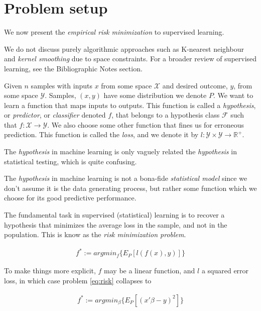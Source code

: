 \documentclass[]{book}
\theoremstyle{definition}
\theoremstyle{definition}
\theoremstyle{remark}
\let\BeginKnitrBlock\begin \let\EndKnitrBlock\end
\begin{document}
\section{Problem setup}\label{problem-setup-3}

We now present the \emph{empirical risk minimization} to supervised
learning.

\BeginKnitrBlock{remark}
We do not discuss purely algorithmic approaches
such as K-nearest neighbour and \emph{kernel smoothing} due to space
constraints. For a broader review of supervised learning, see the
Bibliographic Notes section.
\EndKnitrBlock{remark}

Given \(n\) samples with inputs \(x\) from some space \(\mathcal{X}\)
and desired outcome, \(y\), from some space \(\mathcal{Y}\). Samples,
\((x,y)\) have some distribution we denote \(P\). We want to learn a
function that maps inputs to outputs. This function is called a
\emph{hypothesis}, or \emph{predictor}, or \emph{classifier} denoted
\(f\), that belongs to a hypothesis class \(\mathcal{F}\) such that
\(f:\mathcal{X} \to \mathcal{Y}\). We also choose some other function
that fines us for erroneous prediction. This function is called the
\emph{loss}, and we denote it by
\(l:\mathcal{Y}\times \mathcal{Y} \to \mathbb{R}^+\).

\BeginKnitrBlock{remark}
The \emph{hypothesis} in machine learning is
only vaguely related the \emph{hypothesis} in statistical testing, which
is quite confusing.
\EndKnitrBlock{remark}

\BeginKnitrBlock{remark}
The \emph{hypothesis} in machine learning is not
a bona-fide \emph{statistical model} since we don't assume it is the
data generating process, but rather some function which we choose for
its good predictive performance.
\EndKnitrBlock{remark}

The fundamental task in supervised (statistical) learning is to recover
a hypothesis that minimizes the average loss in the sample, and not in
the population. This is know as the \emph{risk minimization problem}.

\begin{align}
  f^* := argmin_f \{ E_P[l(f(x),y)] \}
  \label{eq:risk}  
\end{align}

To make things more explicit, \(f\) may be a linear function, and \(l\)
a squared error loss, in which case problem \eqref{eq:risk} collapses to

\begin{align}
  f^* := argmin_\beta \{ E_P[(x'\beta-y)^2] \}
\end{align}
\end{document}
